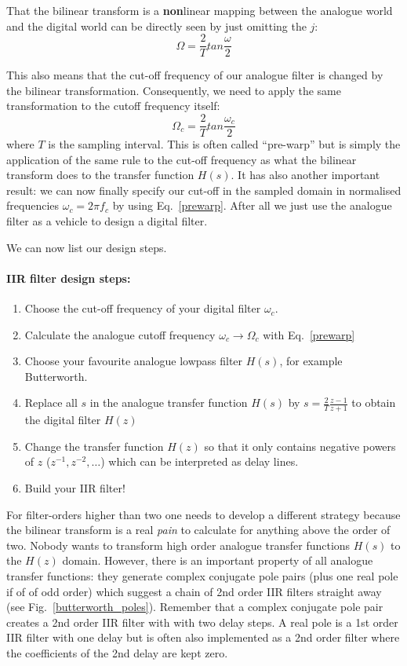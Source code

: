 \documentclass[12pt,a4paper]{article}
\begin{document}
That the bilinear transform is a 
{\bf non}linear mapping between the analogue world and the digital
world can be directly seen by just omitting the $j$:
\begin{equation}
\Omega = \frac{2}{T} tan \frac{\omega}{2}
\end{equation}

This also means that the cut-off frequency of our analogue filter is changed
by the bilinear transformation. Consequently, we need to apply the same
transformation to the cutoff frequency itself:
\begin{equation}
\Omega_{c} = \frac{2}{T} tan \frac {\omega_{c}}{2}
\label{prewarp}
\end{equation}
where $T$ is the sampling interval. This is often called ``pre-warp''
but is simply the application of the same rule to the cut-off
frequency as what the bilinear transform does to the transfer function
$H(s)$. It has also another important result: we can now finally
specify our cut-off in the sampled domain in normalised frequencies
$\omega_{c} = 2\pi f_{c}$ by using Eq.~\ref{prewarp}. After all we
just use the analogue filter as a vehicle to design a digital filter.

We can now list our design steps.

\paragraph{IIR filter design steps:}
\begin{enumerate}
\item Choose the cut-off frequency of your digital filter $\omega_{c}$.
\item Calculate the analogue cutoff frequency $\omega_{c} \rightarrow
  \Omega_{c}$ with Eq.~\ref{prewarp}
\item Choose your favourite analogue lowpass filter $H(s)$,
for example Butterworth.
\item Replace all $s$ in the analogue transfer function
$H(s)$ by $s = \frac{2}{T} \frac{z - 1}{z + 1}$ 
to obtain the digital filter $H(z)$
\item Change the transfer function $H(z)$ so that it only contains
negative powers of $z$ ($z^{-1}, z^{-2}, \ldots$) which can be
interpreted as delay lines.
\item Build your IIR filter!
\end{enumerate}

For filter-orders higher than two one needs to develop a different
strategy because the bilinear transform is a real \textsl{pain} to
calculate for anything above the order of two. Nobody wants to
transform high order analogue transfer functions $H(s)$ to the $H(z)$
domain. However, there is an important property of all analogue
transfer functions: they generate complex conjugate pole pairs (plus
one real pole if of of odd order) which suggest a chain of 2nd order IIR
filters straight away (see Fig.~\ref{butterworth_poles}). Remember
that a complex conjugate pole pair creates a 2nd order IIR filter with
with two delay steps. A real pole is a 1st order IIR filter with one
delay but is often also implemented as a 2nd order filter where the
coefficients of the 2nd delay are kept zero.
\end{document}

